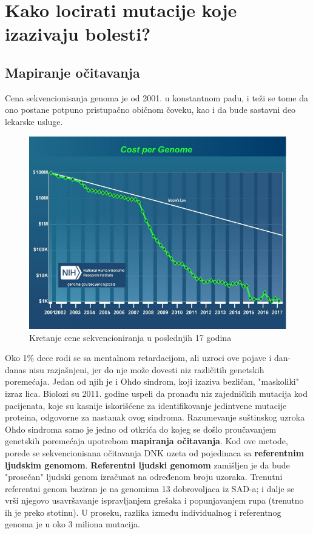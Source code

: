 \chapter {Kako locirati mutacije koje izazivaju bolesti?}
\setbookcodestyle

\section{Mapiranje očitavanja}

\vspace{0.5cm}

Cena sekvencionisanja genoma je od 2001. u konstantnom padu, i teži se tome da ono postane potpuno pristupačno običnom čoveku, kao i da bude sastavni deo lekarske usluge.

\begin{figure}[h!]
\centering
\includegraphics[scale=0.7]{poglavlja/9/slike/CostPerGenom.png}
\caption{Kretanje cene sekvencioniranja u poslednjih 17 godina}
\label{slika:X}
\end{figure}

Oko 1\% dece rodi se sa mentalnom retardacijom, ali uzroci ove pojave i dan-danas nisu razjašnjeni, jer do nje može dovesti niz različitih genetskih poremećaja. Jedan od njih je i Ohdo sindrom, koji izaziva bezličan, "maskoliki" izraz lica. 
Biolozi su 2011. godine uspeli da pronađu niz zajedničkih mutacija kod pacijenata, koje su kasnije iskorišćene za identifikovanje jedintvene mutacije proteina, odgovorne za nastanak ovog sindroma. Razumevanje suštinskog uzroka Ohdo sindroma samo je jedno od otkrića do kojeg se došlo proučavanjem genetskih poremećaja upotrebom \textbf{mapiranja očitavanja}. 
Kod ove metode, porede se sekvencionisana očitavanja DNK uzeta od pojedinaca sa \textbf{referentnim ljudskim genomom}. \textbf{Referentni ljudski genomom} zamišljen je da bude "prosečan" ljudski genom izračunat na određenom broju uzoraka. Trenutni referentni genom baziran je na genomima 13 dobrovoljaca iz SAD-a; i dalje se vrši njegovo usavršavanje ispravljanjem grešaka i popunjavanjem rupa (trenutno ih je preko stotinu). U proseku, razlika između individualnog i referentnog genoma je u oko 3 miliona mutacija.


